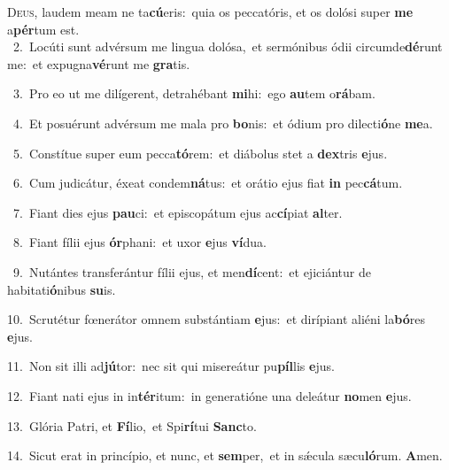 \lettrine{\initial\textcolor{\initialcolor}{D}}{eus,} laudem meam ne ta\-\textbf{cú}\-eris:~\star quia os peccatóris, et os dolósi super \textbf{me} a\-\textbf{pér}\-tum est.\\
{\numbfont\textcolor{\numbcolor}{~2.}}~Locúti sunt advérsum me lingua dolósa,~\dagger et sermónibus ódii circumde\-\textbf{dé}\-runt me:~\star et expugna\-\textbf{vé}\-runt me \textbf{gra}\-tis.\par
{\numbfont\textcolor{\numbcolor}{~3.}}~Pro eo ut me dilígerent, detrahébant \textbf{mi}\-hi:~\star ego \textbf{au}\-tem o\-\textbf{rá}\-bam.\par
{\numbfont\textcolor{\numbcolor}{~4.}}~Et posuérunt advérsum me mala pro \textbf{bo}\-nis:~\star et ódium pro dilecti\-\textbf{ó}\-ne \textbf{me}\-a.\par
{\numbfont\textcolor{\numbcolor}{~5.}}~Constítue super eum pecca\-\textbf{tó}\-rem:~\star et diábolus stet a \textbf{dex}\-tris \textbf{e}\-jus.\par
{\numbfont\textcolor{\numbcolor}{~6.}}~Cum judicátur, éxeat condem\-\textbf{ná}\-tus:~\star et orátio ejus fiat \textbf{in} pec\-\textbf{cá}\-tum.\par
{\numbfont\textcolor{\numbcolor}{~7.}}~Fiant dies ejus \textbf{pau}\-ci:~\star et episcopátum ejus ac\-\textbf{cí}\-piat \textbf{al}\-ter.\par
{\numbfont\textcolor{\numbcolor}{~8.}}~Fiant fílii ejus \textbf{ór}\-phani:~\star et uxor \textbf{e}\-jus \textbf{ví}\-dua.\par
{\numbfont\textcolor{\numbcolor}{~9.}}~Nutántes transferántur fílii ejus, et men\-\textbf{dí}\-cent:~\star et ejiciántur de habitati\-\textbf{ó}\-nibus \textbf{su}\-is.\par
{\numbfont\textcolor{\numbcolor}{10.}}~Scrutétur fœnerátor omnem substántiam \textbf{e}\-jus:~\star et dirípiant aliéni la\-\textbf{bó}\-res \textbf{e}\-jus.\par
{\numbfont\textcolor{\numbcolor}{11.}}~Non sit illi ad\-\textbf{jú}\-tor:~\star nec sit qui misereátur pu\-\textbf{píl}\-lis \textbf{e}\-jus.\par
{\numbfont\textcolor{\numbcolor}{12.}}~Fiant nati ejus in in\-\textbf{tér}\-itum:~\star in generatióne una deleátur \textbf{no}\-men \textbf{e}\-jus.\par
{\numbfont\textcolor{\numbcolor}{13.}}~Glória Patri, et \textbf{Fí}\-lio,~\star et Spi\-\textbf{rí}\-tui \textbf{Sanc}\-to.\par
{\numbfont\textcolor{\numbcolor}{14.}}~Sicut erat in princípio, et nunc, et \textbf{sem}\-per,~\star et in sǽcula sæcu\-\textbf{ló}\-rum. \textbf{A}\-men.\par
